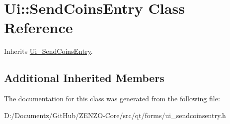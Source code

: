 \hypertarget{class_ui_1_1_send_coins_entry}{}\section{Ui\+::Send\+Coins\+Entry Class Reference}
\label{class_ui_1_1_send_coins_entry}


Inherits \mbox{\hyperlink{class_ui___send_coins_entry}{Ui\+\_\+\+Send\+Coins\+Entry}}.

\subsection*{Additional Inherited Members}


The documentation for this class was generated from the following file\+:\begin{DoxyCompactItemize}
\item 
D\+:/\+Documentz/\+Git\+Hub/\+Z\+E\+N\+Z\+O-\/\+Core/src/qt/forms/ui\+\_\+sendcoinsentry.\+h\end{DoxyCompactItemize}
